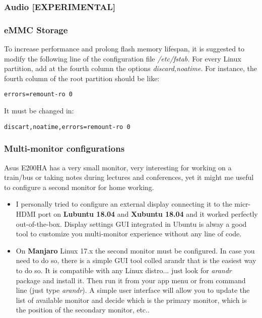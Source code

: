 \documentclass{article}
\begin{document}
\subsubsection{Audio [EXPERIMENTAL]}

\subsubsection{eMMC Storage}
To increase performance and prolong flash memory lifespan, it is suggested to modify the following line of the configuration file \emph{/etc/fstab.} For every Linux partition, add at the fourth column the options \emph{discard,noatime}. For instance, the fourth column of the root partition should be like:
\begin{verbatim}
errors=remount-ro 0
\end{verbatim}
It must be changed in:
\begin{verbatim}
discart,noatime,errors=remount-ro 0
\end{verbatim}

\subsubsection{Multi-monitor configurations}
Asus E200HA has a very small monitor, very interesting for working on a train/bus or taking notes during lectures and conferences, yet it might me useful to configure a second monitor for home working. 

\begin{itemize}
	\item I personally tried to configure an external display connecting it to the micr-HDMI port on \textbf{Lubuntu 18.04} and \textbf{Xubuntu 18.04} and it worked perfectly out-of-the-box. Display settings GUI integrated in Ubuntu is alway a good tool to customize you multi-monitor experience without any line of code.
	\item On \textbf{Manjaro} Linux 17.x the second monitor must be configured. In case you need to do so, there is a simple GUI tool colled arandr that is the easiest way to do so. It is compatible with any Linux distro... just look for \emph{arandr} package and install it. Then run it from your app menu or from command line (just type \emph{arandr}). A simple user interface will allow you to update the list of available monitor and decide which is the primary monitor, which is the position of the secondary monitor, etc..
\end{itemize}
\end{document}

